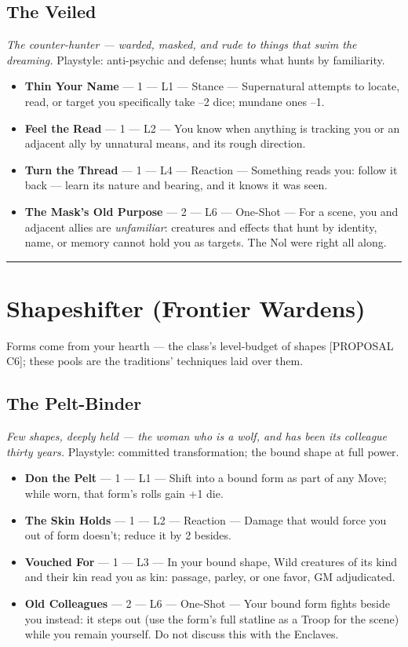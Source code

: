 \subsection{The Veiled}
\textit{The counter-hunter --- warded, masked, and rude to things that swim the dreaming.} Playstyle: anti-psychic and defense; hunts what hunts by familiarity.
\begin{itemize}
    \item \textbf{Thin Your Name} --- 1 --- L1 --- Stance --- Supernatural attempts to locate, read, or target you specifically take --2 dice; mundane ones --1.
    \item \textbf{Feel the Read} --- 1 --- L2 --- You know when anything is tracking you or an adjacent ally by unnatural means, and its rough direction.
    \item \textbf{Turn the Thread} --- 1 --- L4 --- Reaction --- Something reads you: follow it back --- learn its nature and bearing, and it knows it was seen.
    \item \textbf{The Mask's Old Purpose} --- 2 --- L6 --- One-Shot --- For a scene, you and adjacent allies are \textit{unfamiliar}: creatures and effects that hunt by identity, name, or memory cannot hold you as targets. The Nol were right all along.
\end{itemize}

\medskip\hrule\medskip

\section{Shapeshifter \textnormal{(Frontier Wardens)}}

Forms come from your hearth --- the class's level-budget of shapes [PROPOSAL C6]; these pools are the traditions' techniques laid over them.

\subsection{The Pelt-Binder}
\textit{Few shapes, deeply held --- the woman who is a wolf, and has been its colleague thirty years.} Playstyle: committed transformation; the bound shape at full power.
\begin{itemize}
    \item \textbf{Don the Pelt} --- 1 --- L1 --- Shift into a bound form as part of any Move; while worn, that form's rolls gain +1 die.
    \item \textbf{The Skin Holds} --- 1 --- L2 --- Reaction --- Damage that would force you out of form doesn't; reduce it by 2 besides.
    \item \textbf{Vouched For} --- 1 --- L3 --- In your bound shape, Wild creatures of its kind and their kin read you as kin: passage, parley, or one favor, GM adjudicated.
    \item \textbf{Old Colleagues} --- 2 --- L6 --- One-Shot --- Your bound form fights beside you instead: it steps out (use the form's full statline as a Troop for the scene) while you remain yourself. Do not discuss this with the Enclaves.
\end{itemize}

